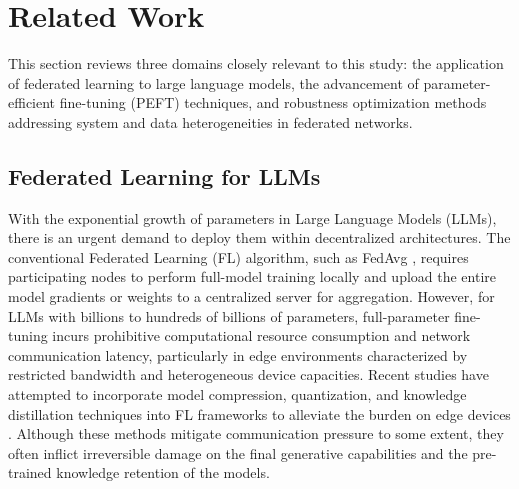 \section{Related Work}This section reviews three domains closely relevant to this study: the application of federated learning to large language models, the advancement of parameter-efficient fine-tuning (PEFT) techniques, and robustness optimization methods addressing system and data heterogeneities in federated networks.

\subsection{Federated Learning for LLMs}With the exponential growth of parameters in Large Language Models (LLMs), there is an urgent demand to deploy them within decentralized architectures. The conventional Federated Learning (FL) algorithm, such as FedAvg \cite{mcmahan2017communication}, requires participating nodes to perform full-model training locally and upload the entire model gradients or weights to a centralized server for aggregation. However, for LLMs with billions to hundreds of billions of parameters, full-parameter fine-tuning incurs prohibitive computational resource consumption and network communication latency, particularly in edge environments characterized by restricted bandwidth and heterogeneous device capacities. Recent studies have attempted to incorporate model compression, quantization, and knowledge distillation techniques into FL frameworks to alleviate the burden on edge devices \cite{kairouz2021advances, mao2021communication}. Although these methods mitigate communication pressure to some extent, they often inflict irreversible damage on the final generative capabilities and the pre-trained knowledge retention of the models.

